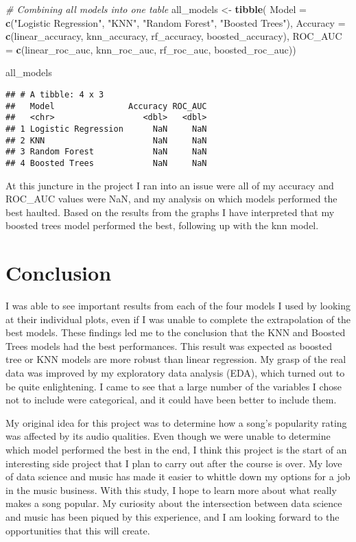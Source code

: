 \documentclass[
]{article}
\newenvironment{Shaded}{\begin{snugshade}}{\end{snugshade}}
\newcommand{\AttributeTok}[1]{\textcolor[rgb]{0.13,0.29,0.53}{#1}}
\newcommand{\CommentTok}[1]{\textcolor[rgb]{0.56,0.35,0.01}{\textit{#1}}}
\newcommand{\FunctionTok}[1]{\textcolor[rgb]{0.13,0.29,0.53}{\textbf{#1}}}
\newcommand{\NormalTok}[1]{#1}
\newcommand{\OtherTok}[1]{\textcolor[rgb]{0.56,0.35,0.01}{#1}}
\newcommand{\StringTok}[1]{\textcolor[rgb]{0.31,0.60,0.02}{#1}}
\begin{document}
\begin{Shaded}
\begin{Highlighting}[]
\CommentTok{\# Combining all models into one table}
\NormalTok{all\_models }\OtherTok{\textless{}{-}} \FunctionTok{tibble}\NormalTok{(}
  \AttributeTok{Model =} \FunctionTok{c}\NormalTok{(}\StringTok{"Logistic Regression"}\NormalTok{, }\StringTok{"KNN"}\NormalTok{, }\StringTok{"Random Forest"}\NormalTok{, }\StringTok{"Boosted Trees"}\NormalTok{),}
  \AttributeTok{Accuracy =} \FunctionTok{c}\NormalTok{(linear\_accuracy, knn\_accuracy, rf\_accuracy, boosted\_accuracy),}
  \AttributeTok{ROC\_AUC =} \FunctionTok{c}\NormalTok{(linear\_roc\_auc, knn\_roc\_auc, rf\_roc\_auc, boosted\_roc\_auc))}

\NormalTok{all\_models}
\end{Highlighting}
\end{Shaded}

\begin{verbatim}
## # A tibble: 4 x 3
##   Model               Accuracy ROC_AUC
##   <chr>                  <dbl>   <dbl>
## 1 Logistic Regression      NaN     NaN
## 2 KNN                      NaN     NaN
## 3 Random Forest            NaN     NaN
## 4 Boosted Trees            NaN     NaN
\end{verbatim}

At this juncture in the project I ran into an issue were all of my
accuracy and ROC\_AUC values were NaN, and my analysis on which models
performed the best haulted. Based on the results from the graphs I have
interpreted that my boosted trees model performed the best, following up
with the knn model.

\hypertarget{conclusion}{%
\section{\texorpdfstring{\textbf{Conclusion}}{Conclusion}}\label{conclusion}}

I was able to see important results from each of the four models I used
by looking at their individual plots, even if I was unable to complete
the extrapolation of the best models. These findings led me to the
conclusion that the KNN and Boosted Trees models had the best
performances. This result was expected as boosted tree or KNN models are
more robust than linear regression. My grasp of the real data was
improved by my exploratory data analysis (EDA), which turned out to be
quite enlightening. I came to see that a large number of the variables I
chose not to include were categorical, and it could have been better to
include them.

My original idea for this project was to determine how a song's
popularity rating was affected by its audio qualities. Even though we
were unable to determine which model performed the best in the end, I
think this project is the start of an interesting side project that I
plan to carry out after the course is over. My love of data science and
music has made it easier to whittle down my options for a job in the
music business. With this study, I hope to learn more about what really
makes a song popular. My curiosity about the intersection between data
science and music has been piqued by this experience, and I am looking
forward to the opportunities that this will create.
\end{document}
